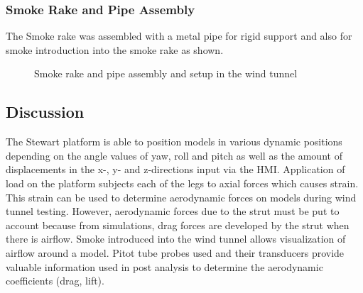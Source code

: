 \subsubsection{Smoke Rake and Pipe Assembly}
The Smoke rake was assembled with a metal pipe for rigid support and also for smoke introduction into the
smoke rake as shown.
\begin{figure}[!htb]%
	\centering
	\qquad
	\caption[Final rake and pipe]{Smoke rake and pipe assembly and setup in the wind tunnel}%
	\label{fig:result1}%
\end{figure}

\subsection{Discussion}
The Stewart platform is able to position models in various dynamic positions depending on the angle values
of yaw, roll and pitch as well as the amount of displacements in the x-, y- and z-directions input via the HMI.
 Application of load on the platform
subjects each of the legs to axial forces which causes strain. This strain can be used to determine aerodynamic forces
on models during wind tunnel testing. However, aerodynamic forces due to the strut must be put to account because from
simulations, drag forces are developed by the strut when there is airflow. Smoke introduced into the wind tunnel allows
visualization of airflow around a model. Pitot tube probes used and their transducers provide valuable information used 
in post analysis to determine the aerodynamic coefficients (drag, lift).